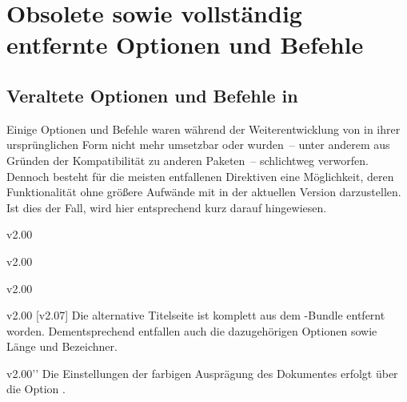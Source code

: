 \chapter{%
  Obsolete sowie vollständig entfernte Optionen und Befehle%
  \label{sec:obsolete}%
}
\section{%
  Veraltete Optionen und Befehle in \TUDScript%
}
Einige Optionen und Befehle waren während der Weiterentwicklung von \TUDScript
in ihrer ursprünglichen Form nicht mehr umsetzbar oder wurden~-- unter anderem 
aus Gründen der Kompatibilität zu anderen Paketen~-- schlichtweg verworfen. 
Dennoch besteht für die meisten entfallenen Direktiven eine Möglichkeit, deren 
Funktionalität ohne größere Aufwände mit \TUDScript in der aktuellen Version 
\vTUDScript{} darzustellen. Ist dies der Fall, wird hier entsprechend kurz 
darauf hingewiesen.

\NewDocumentCommand{}


%
\begin{Obsolete}{v2.00}{}
\begin{Obsolete}{v2.00}{}
\begin{Obsolete}{v2.00}{}
\begin{Obsolete}{v2.00}{}
\printdeclarationlist%
%
[v2.07]
Die alternative Titelseite ist komplett aus dem \TUDScript-Bundle entfernt 
worden. Dementsprechend entfallen auch die dazugehörigen Optionen sowie Länge 
und Bezeichner.
\end{Obsolete}
\end{Obsolete}
\end{Obsolete}
\end{Obsolete}

\begin{Obsolete}{v2.00}{}''
\printdeclarationlist%
%
Die Einstellungen der farbigen Ausprägung des Dokumentes erfolgt über die 
Option .
\end{Obsolete}

